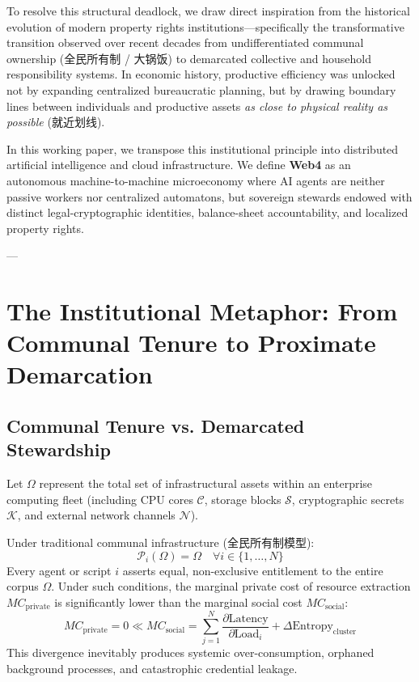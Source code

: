 \documentclass[11pt,a4paper]{article}
\begin{document}
To resolve this structural deadlock, we draw direct inspiration from the historical evolution of modern property rights institutions—specifically the transformative transition observed over recent decades from undifferentiated communal ownership (全民所有制 / 大锅饭) to demarcated collective and household responsibility systems. In economic history, productive efficiency was unlocked not by expanding centralized bureaucratic planning, but by drawing boundary lines between individuals and productive assets \textit{as close to physical reality as possible} (就近划线).

In this working paper, we transpose this institutional principle into distributed artificial intelligence and cloud infrastructure. We define \textbf{Web4} as an autonomous machine-to-machine microeconomy where AI agents are neither passive workers nor centralized automatons, but sovereign stewards endowed with distinct legal-cryptographic identities, balance-sheet accountability, and localized property rights.

---

\section{The Institutional Metaphor: From Communal Tenure to Proximate Demarcation}

\subsection{Communal Tenure vs. Demarcated Stewardship}

Let $\Omega$ represent the total set of infrastructural assets within an enterprise computing fleet (including CPU cores $\mathcal{C}$, storage blocks $\mathcal{S}$, cryptographic secrets $\mathcal{K}$, and external network channels $\mathcal{N}$).

Under traditional communal infrastructure (全民所有制模型):
\begin{equation}
\mathcal{P}_i(\Omega) = \Omega \quad \forall i \in \{1, \dots, N\}
\end{equation}
Every agent or script $i$ asserts equal, non-exclusive entitlement to the entire corpus $\Omega$. Under such conditions, the marginal private cost of resource extraction $MC_{\text{private}}$ is significantly lower than the marginal social cost $MC_{\text{social}}$:
\begin{equation}
MC_{\text{private}} = 0 \ll MC_{\text{social}} = \sum_{j=1}^N \frac{\partial \text{Latency}}{\partial \text{Load}_i} + \Delta \text{Entropy}_{\text{cluster}}
\end{equation}
This divergence inevitably produces systemic over-consumption, orphaned background processes, and catastrophic credential leakage.
\end{document}
